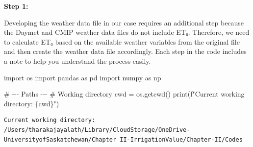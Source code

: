 \documentclass[
  letterpaper,
  DIV=11,
  numbers=noendperiod]{scrartcl}
\newenvironment{Shaded}{\begin{snugshade}}{\end{snugshade}}
\newcommand{\BuiltInTok}[1]{\textcolor[rgb]{0.00,0.23,0.31}{#1}}
\newcommand{\CommentTok}[1]{\textcolor[rgb]{0.37,0.37,0.37}{#1}}
\newcommand{\ImportTok}[1]{\textcolor[rgb]{0.00,0.46,0.62}{#1}}
\newcommand{\NormalTok}[1]{\textcolor[rgb]{0.00,0.23,0.31}{#1}}
\newcommand{\OperatorTok}[1]{\textcolor[rgb]{0.37,0.37,0.37}{#1}}
\newcommand{\SpecialCharTok}[1]{\textcolor[rgb]{0.37,0.37,0.37}{#1}}
\newcommand{\SpecialStringTok}[1]{\textcolor[rgb]{0.13,0.47,0.30}{#1}}
\begin{document}
\textbf{Step 1:}

Developing the weather data file in our case requires an additional step
because the Daymet and CMIP weather data files do not include ET₀.
Therefore, we need to calculate ET₀ based on the available weather
variables from the original file and then create the weather data file
accordingly. Each step in the code includes a note to help you
understand the process easily.

\begin{Shaded}
\begin{Highlighting}[]
\ImportTok{import}\NormalTok{ os}
\ImportTok{import}\NormalTok{ pandas }\ImportTok{as}\NormalTok{ pd}
\ImportTok{import}\NormalTok{ numpy }\ImportTok{as}\NormalTok{ np}

\CommentTok{\# {-}{-}{-} Paths {-}{-}{-}}
\CommentTok{\# Working directory}
\NormalTok{cwd }\OperatorTok{=}\NormalTok{ os.getcwd()}
\BuiltInTok{print}\NormalTok{(}\SpecialStringTok{f"Current working directory: }\SpecialCharTok{\{}\NormalTok{cwd}\SpecialCharTok{\}}\SpecialStringTok{"}\NormalTok{)}
\end{Highlighting}
\end{Shaded}

\begin{verbatim}
Current working directory: /Users/tharakajayalath/Library/CloudStorage/OneDrive-UniversityofSaskatchewan/Chapter II-IrrigationValue/Chapter-II/Codes
\end{verbatim}
\end{document}
